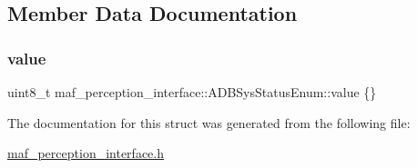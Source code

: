 \subsection{Member Data Documentation}
\mbox{\label{structmaf__perception__interface_1_1ADBSysStatusEnum_a4c4fb3b48a8c4edc6354ce74fe1e97c2}} 
\subsubsection{\texorpdfstring{value}{value}}
{\footnotesize\ttfamily uint8\+\_\+t maf\+\_\+perception\+\_\+interface\+::\+A\+D\+B\+Sys\+Status\+Enum\+::value \{\}}



The documentation for this struct was generated from the following file\+:\begin{DoxyCompactItemize}
\item 
\hyperlink{maf__perception__interface_8h}{maf\+\_\+perception\+\_\+interface.\+h}\end{DoxyCompactItemize}
